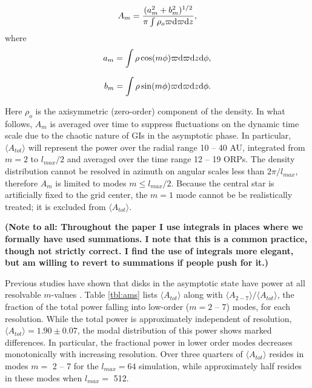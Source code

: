 \documentclass[manuscript]{aastex} %
\newcounter{subequation}
\begin{document}
\begin{equation}
A_m = \frac{(a_m^2 + b_m^2)^{1/2}}{\pi\int\rho_o \varpi {\rm d}\varpi {\rm d}z},
\end{equation}
where
\renewcommand{\theequation}{\arabic{equation}\alph{subequation}}
\setcounter{subequation}{2}
\begin{equation}
a_m = \int \rho \cos(m\phi)\varpi {\rm d}\varpi {\rm d}z {\rm d}\phi,
\end{equation}
\addtocounter{equation}{-1}
\addtocounter{subequation}{1}
\begin{equation}
b_m =\int \rho \sin(m\phi)\varpi {\rm d}\varpi {\rm d}z {\rm d}\phi.
\end{equation}
\renewcommand{\theequation}{\arabic{equation}}

Here  $\rho_o$ is the axisymmetric (zero-order)  component of the density. In what follows, $A_m$ is averaged over time to suppress fluctuations on the dynamic time scale due to the chaotic nature of GIs in the asymptotic  phase.
In particular, $\langle A_{tot} \rangle$ will represent the power over the radial range 10 -- 40 AU, integrated from $ m = 2$ to $l_{max}/2$ and averaged over the time range 12 -- 19 ORPs. The density distribution cannot be resolved in azimuth on angular scales less than $2\pi/l_{max}$, therefore $A_m$ is limited to modes $m \le l_{max}/2$.  
Because the central star is artificially fixed to the grid center, the $m = 1$ mode cannot be be realistically treated; it is excluded from $\langle A_{tot} \rangle$.

{\bf (Note to all: Throughout the paper I use integrals in places where we 
formally have used summations.  I note that this is a common practice, though
not strictly correct.  I find the use of integrals more elegant, but am willing to
revert to summations if people push for it.)}

Previous studies have shown that disks in the asymptotic state have power at all resolvable $m$-values  \citep[e.g.]{mejia2005,boley2006}.  Table \ref{tbl:ams} lists $\langle A_{tot} \rangle$ along with $\langle A_{2-7} \rangle  /  \langle A_{tot} \rangle$,  the fraction of the total power falling into low-order ($m = 2$ -- 7) modes, for each resolution. While the total power is approximately independent of resolution, $\langle A_{tot} \rangle = 1.90 \pm 0.07$, 
the modal distribution of this power shows marked differences. In particular, the fractional power in lower order modes decreases monotonically with increasing resolution.  Over three quarters of $\langle A_{tot} \rangle$ resides
in modes $m =$ 2 -- 7 for the $l_{max} = 64$ simulation, while approximately half resides in these modes when $l_{max} =$ 512.
\end{document}
